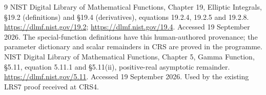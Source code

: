 \begin{thebibliography}{9}
NIST Digital Library of Mathematical Functions, Chapter 19,
Elliptic Integrals, \S19.2 (definitions) and \S19.4 (derivatives),
equations 19.2.4, 19.2.5 and 19.2.8.
\url{https://dlmf.nist.gov/19.2};
\url{https://dlmf.nist.gov/19.4}.
Accessed 19 September 2026. The special-function definitions have
this human-authored provenance; the parameter dictionary and scalar
remainders in CRS are proved in the programme.
NIST Digital Library of Mathematical Functions, Chapter 5,
Gamma Function, \S5.11, equation 5.11.1 and \S5.11(ii),
positive-real asymptotic remainder.
\url{https://dlmf.nist.gov/5.11}.
Accessed 19 September 2026. Used by the existing LRS7 proof received
at CRS4.
\end{thebibliography}
